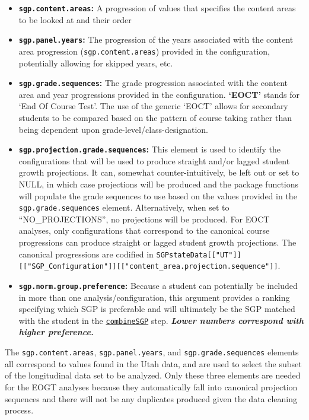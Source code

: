 \documentclass[12pt]{article}
\begin{document}
\begin{itemize}
\itemsep1pt\parskip0pt
\item
  \textbf{\texttt{sgp.content.areas}:} A progression of values that
  specifies the content areas to be looked at and their order
\item
  \textbf{\texttt{sgp.panel.years}:} The progression of the years
  associated with the content area progression
  (\texttt{sgp.content.areas}) provided in the configuration,
  potentially allowing for skipped years, etc.
\item
  \textbf{\texttt{sgp.grade.sequences}:} The grade progression
  associated with the content area and year progressions provided in the
  configuration. \textbf{`EOCT'} stands for `End Of Course Test'. The
  use of the generic `EOCT' allows for secondary students to be compared
  based on the pattern of course taking rather than being dependent upon
  grade-level/class-designation.
\item
  \textbf{\texttt{sgp.projection.grade.sequences}:} This element is used
  to identify the configurations that will be used to produce straight
  and/or lagged student growth projections. It can, somewhat
  counter-intuitively, be left out or set to NULL, in which case
  projections will be produced and the package functions will populate
  the grade sequences to use based on the values provided in the
  \texttt{sgp.grade.sequences} element. Alternatively, when set to
  ``NO\_PROJECTIONS'', no projections will be produced. For EOCT
  analyses, only configurations that correspond to the canonical course
  progressions can produce straight or lagged student growth
  projections. The canonical progressions are codified in
  \texttt{SGPstateData{[}{[}"UT"{]}{]}{[}{[}"SGP\_Configuration"{]}{]}{[}{[}"content\_area.projection.sequence"{]}{]}}.
\item
  \textbf{\texttt{sgp.norm.group.preference}:} Because a student can
  potentially be included in more than one analysis/configuration, this
  argument provides a ranking specifying which SGP is preferable and
  will ultimately be the SGP matched with the student in the
  \href{https://github.com/CenterForAssessment/SGP/blob/master/R/combineSGP.R}{\texttt{combineSGP}}
  step. \textbf{\emph{Lower numbers correspond with higher preference.}}
\end{itemize}

The \texttt{sgp.content.areas}, \texttt{sgp.panel.years}, and
\texttt{sgp.grade.sequences} elements all correspond to values found in
the Utah data, and are used to select the subset of the longitudinal
data set to be analyzed. Only these three elements are needed for the
EOGT analyses because they automatically fall into canonical projection
sequences and there will not be any duplicates produced given the data
cleaning process.
\end{document}
